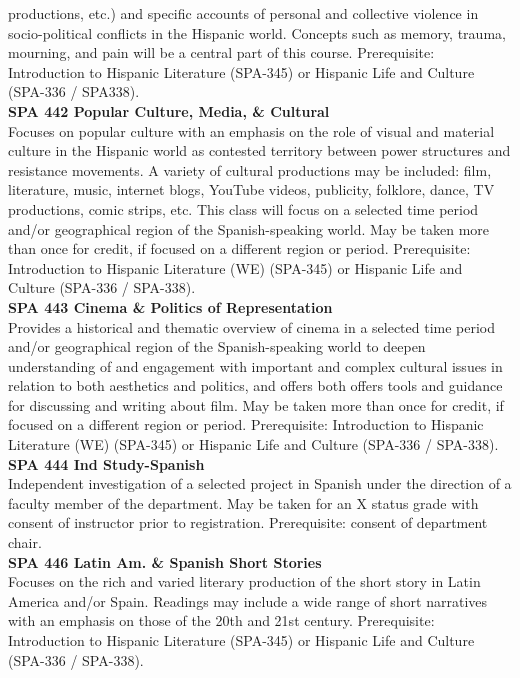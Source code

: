 \documentclass[
  letterpaper,
]{scrbook}
\begin{document}
productions, etc.) and specific accounts of personal and collective
violence in socio-political conflicts in the Hispanic world. Concepts
such as memory, trauma, mourning, and pain will be a central part of
this course. Prerequisite: Introduction to Hispanic Literature (SPA-345)
or Hispanic Life and Culture (SPA-336 / SPA338).\\
\textbf{SPA 442 Popular Culture, Media, \& Cultural}\\
Focuses on popular culture with an emphasis on the role of visual and
material culture in the Hispanic world as contested territory between
power structures and resistance movements. A variety of cultural
productions may be included: film, literature, music, internet blogs,
YouTube videos, publicity, folklore, dance, TV productions, comic
strips, etc. This class will focus on a selected time period and/or
geographical region of the Spanish-speaking world. May be taken more
than once for credit, if focused on a different region or period.
Prerequisite: Introduction to Hispanic Literature (WE) (SPA-345) or
Hispanic Life and Culture (SPA-336 / SPA-338).\\
\textbf{SPA 443 Cinema \& Politics of Representation}\\
Provides a historical and thematic overview of cinema in a selected time
period and/or geographical region of the Spanish-speaking world to
deepen understanding of and engagement with important and complex
cultural issues in relation to both aesthetics and politics, and offers
both offers tools and guidance for discussing and writing about film.
May be taken more than once for credit, if focused on a different region
or period. Prerequisite: Introduction to Hispanic Literature (WE)
(SPA-345) or Hispanic Life and Culture (SPA-336 / SPA-338).\\
\textbf{SPA 444 Ind Study-Spanish}\\
Independent investigation of a selected project in Spanish under the
direction of a faculty member of the department. May be taken for an X
status grade with consent of instructor prior to registration.
Prerequisite: consent of department chair.\\
\textbf{SPA 446 Latin Am. \& Spanish Short Stories}\\
Focuses on the rich and varied literary production of the short story in
Latin America and/or Spain. Readings may include a wide range of short
narratives with an emphasis on those of the 20th and 21st century.
Prerequisite: Introduction to Hispanic Literature (SPA-345) or Hispanic
Life and Culture (SPA-336 / SPA-338).\\
\end{document}

